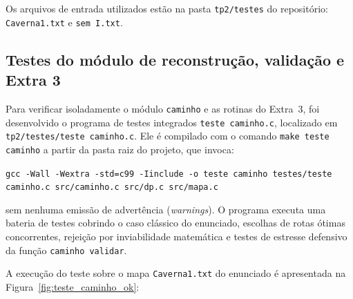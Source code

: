 \documentclass[12pt,a4paper]{article}
\makeatletter
\DeclareRobustCommand{\_}{%
  \ifmmode
    \nfss@text{\textunderscore}%
  \else
    \textunderscore\allowbreak
  \fi
}
\makeatother
\begin{document}
Os arquivos de entrada utilizados estão na pasta \texttt{tp2/testes} do repositório: \texttt{Caverna1.txt} e \texttt{sem\_I.txt}.

\subsection{Testes do módulo de reconstrução, validação e Extra 3}

Para verificar isoladamente o módulo \texttt{caminho} e as rotinas do Extra~3, foi desenvolvido o programa de testes integrados \texttt{teste\_caminho.c}, localizado em \texttt{tp2/testes/teste\_caminho.c}. Ele é compilado com o comando \texttt{make teste\_caminho} a partir da pasta raiz do projeto, que invoca:
\begin{center}
\texttt{gcc -Wall -Wextra -std=c99 -Iinclude -o teste\_caminho testes/teste\_caminho.c src/caminho.c src/dp.c src/mapa.c}
\end{center}
sem nenhuma emissão de advertência (\textit{warnings}). O programa executa uma bateria de testes cobrindo o caso clássico do enunciado, escolhas de rotas ótimas concorrentes, rejeição por inviabilidade matemática e testes de estresse defensivo da função \texttt{caminho\_validar}.

A execução do teste sobre o mapa \texttt{Caverna1.txt} do enunciado é apresentada na Figura~\ref{fig:teste_caminho_ok}:
\end{document}
